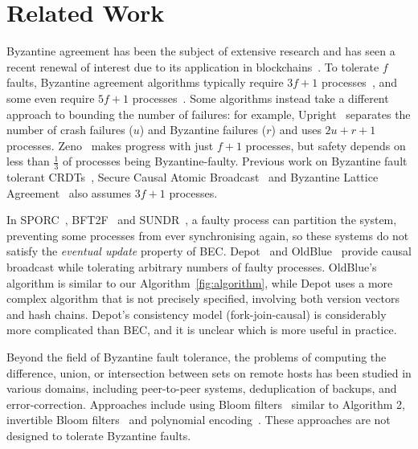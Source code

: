 \documentclass[a4paper,anonymous,USenglish]{lipics-v2019}
\begin{document}
\section{Related Work}\label{sec:relwork}


Byzantine agreement has been the subject of extensive research and has seen a recent renewal of interest due to its application in blockchains~\cite{Bano:2019}.
To tolerate $f$ faults, Byzantine agreement algorithms typically require $3f+1$ processes~\cite{Castro:1999,Kotla:2007,Bessani:2014}, and some even require $5f+1$ processes~\cite{Abd:2005,Martin:2006}.
Some algorithms instead take a different approach to bounding the number of failures: for example, Upright~\cite{Clement:2009} separates the number of crash failures ($u$) and Byzantine failures ($r$) and uses $2u+r+1$ processes.
Zeno~\cite{Singh:2009} makes progress with just $f+1$ processes, but safety depends on less than $\frac{1}{3}$ of processes being Byzantine-faulty.
Previous work on Byzantine fault tolerant CRDTs~\cite{Chai:2014,Shoker:2017,Zhao:2016}, Secure Causal Atomic Broadcast~\cite{Cachin:2001cj,Duan:2017} and Byzantine Lattice Agreement~\cite{DiLuna:2020} also assumes $3f+1$ processes.

In SPORC~\cite{Feldman:2010wl}, BFT2F~\cite{Li:2007} and SUNDR~\cite{Mazieres:2002}, a faulty process can partition the system, preventing some processes from ever synchronising again, so these systems do not satisfy the \emph{eventual update} property of BEC.
Depot~\cite{Mahajan:2011} and OldBlue~\cite{VanGundy:2012} provide causal broadcast while tolerating arbitrary numbers of faulty processes.
OldBlue's algorithm is similar to our Algorithm~\ref{fig:algorithm}, while Depot uses a more complex algorithm that is not precisely specified, involving both version vectors and hash chains.
Depot's consistency model (fork-join-causal) is considerably more complicated than BEC, and it is unclear which is more useful in practice.

Beyond the field of Byzantine fault tolerance, the problems of computing the difference, union, or intersection between sets on remote hosts has been studied in various domains, including peer-to-peer systems, deduplication of backups, and error-correction.
Approaches include using Bloom filters~\cite{Skjegstad:2011} similar to Algorithm 2, invertible Bloom filters~\cite{Goodrich:2011,Eppstein:2011} and polynomial encoding~\cite{Minsky:2006}.
These approaches are not designed to tolerate Byzantine faults.
\end{document}
